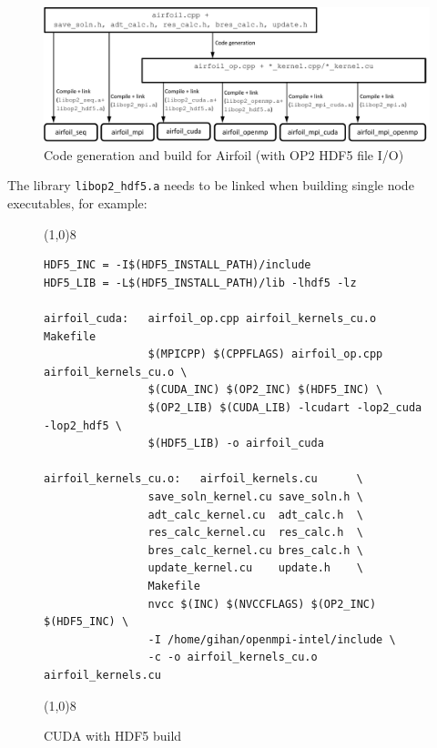 \documentclass[11pt]{article}
\begin{document}
\begin{figure}[ht]\centering\vspace{0pt}
\includegraphics[width=15.5cm]{airfoil_hdf5}\vspace{-0pt}
\caption{Code generation and build for Airfoil (with OP2 HDF5 file I/O)}\label{fig/build-paths-hdf5}\vspace{-5pt}
\end{figure}

\newpage
\noindent The library \texttt{libop2\_hdf5.a} needs to be linked when building single node executables, for example:

\begin{figure}[!h]\small
\vspace{-0pt}\noindent\line(1,0){8}\vspace{-10pt}
\begin{lstlisting}
HDF5_INC = -I$(HDF5_INSTALL_PATH)/include
HDF5_LIB = -L$(HDF5_INSTALL_PATH)/lib -lhdf5 -lz

airfoil_cuda:   airfoil_op.cpp airfoil_kernels_cu.o Makefile
                $(MPICPP) $(CPPFLAGS) airfoil_op.cpp airfoil_kernels_cu.o \
                $(CUDA_INC) $(OP2_INC) $(HDF5_INC) \
                $(OP2_LIB) $(CUDA_LIB) -lcudart -lop2_cuda -lop2_hdf5 \
                $(HDF5_LIB) -o airfoil_cuda

airfoil_kernels_cu.o:   airfoil_kernels.cu      \
                save_soln_kernel.cu save_soln.h \
                adt_calc_kernel.cu  adt_calc.h  \
                res_calc_kernel.cu  res_calc.h  \
                bres_calc_kernel.cu bres_calc.h \
                update_kernel.cu    update.h    \
                Makefile
                nvcc $(INC) $(NVCCFLAGS) $(OP2_INC) $(HDF5_INC) \
                -I /home/gihan/openmpi-intel/include \
                -c -o airfoil_kernels_cu.o airfoil_kernels.cu
\end{lstlisting}\vspace{-10pt}
\vspace{-0pt}\noindent\line(1,0){8}\vspace{-10pt}
\caption{\small CUDA with HDF5 build }
\normalsize\vspace{-10pt}\label{fig:hdf5build}
\end{figure}
\end{document}
